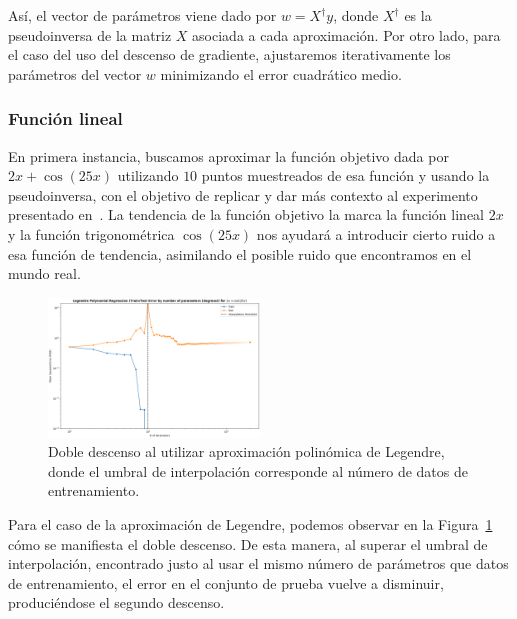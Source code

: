 Así, el vector de parámetros viene dado por $w = X^{\dagger} y$, donde $X^{\dagger}$ es la pseudoinversa de la matriz $X$ asociada a cada aproximación. Por otro lado, para el caso del uso del descenso de gradiente, ajustaremos iterativamente los parámetros del vector $w$ minimizando el error cuadrático medio.\newline

\subsubsection{Función lineal}\label{subsubsec:funcion-lineal}

En primera instancia, buscamos aproximar la función objetivo dada por $2x + \cos(25x)$ utilizando $10$ puntos muestreados de esa función y usando la pseudoinversa, con el objetivo de replicar y dar más contexto al experimento presentado en~\cite{Schaeffer2023}. La tendencia de la función objetivo la marca la función lineal $2x$ y la función trigonométrica $\cos(25x)$ nos ayudará a introducir cierto ruido a esa función de tendencia, asimilando el posible ruido que encontramos en el mundo real.\newline

\begin{figure}[h]
    \centering
    \includegraphics[width=0.5\textwidth]{img/experiments/legendre1DDD.png}
    \caption[Doble descenso al utilizar aproximación polinómica de Legendre.]{Doble descenso al utilizar aproximación polinómica de Legendre, donde el umbral de interpolación corresponde al número de datos de entrenamiento.}\label{fig:legendre1DDD}
\end{figure}

Para el caso de la aproximación de Legendre, podemos observar en la Figura~\ref{fig:legendre1DDD} cómo se manifiesta el doble descenso. De esta manera, al superar el umbral de interpolación, encontrado justo al usar el mismo número de parámetros que datos de entrenamiento, el error en el conjunto de prueba vuelve a disminuir, produciéndose el segundo descenso.\newline

